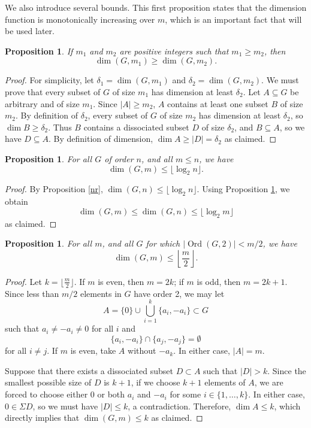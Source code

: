 \documentclass[11pt]{article}
\newtheorem{prop}[thm]{Proposition}
\begin{document}
We also introduce several bounds. This first proposition states that the dimension function is monotonically increasing over $m$, which is an important fact that will be used later.

\begin{prop}\label{m1m2}
If $m_1$ and $m_2$ are positive integers such that $m_1\geq m_2$, then
\[\dim(G,m_1)\geq\dim(G,m_2).\]
\end{prop}
\begin{proof}
For simplicity, let $\delta_1=\dim(G, m_1)$ and $\delta_2=\dim(G, m_2)$. We must prove that every subset of $G$ of size $m_1$ has dimension at least $\delta_2$. Let $A\subseteq G$ be arbitrary and of size $m_1$.
Since $|A|\geq m_2$, $A$ contains at least one subset $B$ of size $m_2$. By definition of $\delta_2$, every subset of $G$ of size $m_2$ has dimension at least $\delta_2$, so $\dim B\geq \delta_2$. Thus $B$ contains a dissociated subset $D$ of size $\delta_2$, and $B\subseteq A$, so we have $D\subseteq A$. By definition of dimension, $\dim A\geq |D|=\delta_2$ as claimed.
\end{proof}

\begin{prop}\label{logn}
    For all $G$ of order $n$, and all $m\leq n$, we have
    \[\dim(G,m)\leq\lfloor \log_2 n \rfloor.\]
\end{prop}
\begin{proof}
    By Proposition \ref{nr}, $\dim(G,n)\leq\lfloor\log_2 n\rfloor.$ Using Proposition \ref{m1m2}, we obtain
    \[\dim(G,m)\leq\dim(G,n)\leq\lfloor\log_2 m\rfloor\]
    as claimed.
\end{proof}

\begin{prop}\label{m/2}
For all $m$, and all $G$ for which $|\!\operatorname{Ord}(G,2)|<m/2$, we have $$\dim(G,m)\leq \left\lfloor \frac{m}{2}\right\rfloor.$$
\end{prop}
\begin{proof}
Let $k=\lfloor \frac{m}{2}\rfloor$. If $m$ is even, then $m=2k$; if $m$ is odd, then $m=2k+1$. Since less than $m/2$ elements in $G$ have order 2, we may let
\[A=\{0\}\cup\bigcup_{i=1}^k \{a_i,-a_i\}\subset G\]
such that $a_i\neq -a_i\neq 0$ for all $i$ and
\[\{a_i,-a_i\}\cap\{a_j,-a_j\}=\emptyset\]
for all $i\neq j$. If $m$ is even, take $A$ without $-a_k$.
    In either case, $|A|=m$. 
    
    Suppose that there exists a dissociated subset $D\subset A$ such that $|D|> k$. Since the smallest possible size of $D$ is $k+1$, if we choose $k+1$ elements of $A$, we are forced to choose either 0 or both $a_i$ and $-a_i$ for some $i\in \{1,\ldots,k\}$. In either case, $0\in \Sigma D$, so we must have $|D|\leq k$, a contradiction. Therefore, $\dim A\leq k$, which directly implies that $\dim(G,m)\leq k$ as claimed.
\end{proof}
\end{document}
